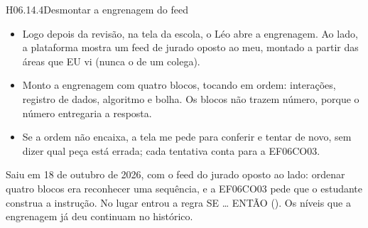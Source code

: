 \begin{historia}{H06.14.4}{Desmontar a engrenagem do feed}{\arquivada}
\aceite
\begin{itemize}
  \item Logo depois da revisão, na tela da escola, o Léo abre a engrenagem.
    Ao lado, a plataforma mostra um feed de jurado oposto ao meu, montado a
    partir das áreas que EU vi (nunca o de um colega).
  \item Monto a engrenagem com quatro blocos, tocando em ordem: interações,
    registro de dados, algoritmo e bolha. Os blocos não trazem número,
    porque o número entregaria a resposta.
  \item Se a ordem não encaixa, a tela me pede para conferir e tentar de novo,
    sem dizer qual peça está errada; cada tentativa conta para a EF06CO03.
\end{itemize}
Saiu em 18 de outubro de 2026, com o feed do jurado oposto ao lado: ordenar
quatro blocos era reconhecer uma sequência, e a EF06CO03 pede que o estudante
construa a instrução. No lugar entrou a regra SE \ldots{} ENTÃO
(). Os níveis que a engrenagem já deu continuam no histórico.
\end{historia}

